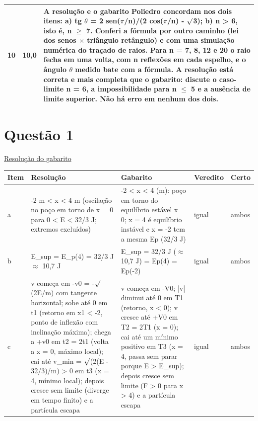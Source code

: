 \documentclass{article}%
\begin{document}
\begin{longtable}{@{}c c p{}@{}}
10 & 10,0 & A resolução e o gabarito Poliedro concordam nos dois itens: a) tg $\theta$ = 2 sen($\pi$/n)/(2 cos($\pi$/n) - $\surd$3); b) n > 6, isto é, n $\geq$ 7. Conferi a fórmula por outro caminho (lei dos senos $\times$ triângulo retângulo) e com uma simulação numérica do traçado de raios. Para n = 7, 8, 12 e 20 o raio fecha em uma volta, com n reflexões em cada espelho, e o ângulo $\theta$ medido bate com a fórmula. A resolução está correta e mais completa que o gabarito: discute o caso{-}limite n = 6, a impossibilidade para n $\leq$ 5 e a ausência de limite superior. Não há erro em nenhum dos dois. \\
\bottomrule\end{longtable}%
\section*{Questão 1}%
\href{https://poliedroresolve.sistemapoliedro.com.br/vestibulares/ime/2026/ime-2-fase-dia-2-24-10-2025-2-fase-dia-2/dissertativa-1-fisica-2-fase-dia-2-ime-2026}{Resolução do gabarito}\par\smallskip%
\begin{longtable}{@{}p{} p{} p{} p{} p{}@{}}\toprule Item & Resolução & Gabarito & Veredito & Certo \\ \midrule
a & -2 m < x < 4 m (oscilação no poço em torno de x = 0 para 0 < E < 32/3 J; extremos excluídos) & -2 < x < 4 (m): poço em torno do equilíbrio estável x = 0; x = 4 é equilíbrio instável e x = -2 tem a mesma Ep (32/3 J) & igual & ambos \\
b & E\_sup = E\_p(4) = 32/3 J $\approx$ 10,7 J & E\_sup = 32/3 J ($\approx$ 10,7 J) = Ep(4) = Ep(-2) & igual & ambos \\
c & v começa em -v0 = -$\surd$(2E/m) com tangente horizontal; sobe até 0 em t1 (retorno em x1 < -2, ponto de inflexão com inclinação máxima); chega a +v0 em t2 = 2t1 (volta a x = 0, máximo local); cai até v\_min = $\surd$(2(E - 32/3)/m) > 0 em t3 (x = 4, mínimo local); depois cresce sem limite (diverge em tempo finito) e a partícula escapa & v começa em -V0; |v| diminui até 0 em T1 (retorno, x < 0); v cresce até +V0 em T2 = 2T1 (x = 0); cai até um mínimo positivo em T3 (x = 4, passa sem parar porque E > E\_sup); depois cresce sem limite (F > 0 para x > 4) e a partícula escapa & igual & ambos \\
\bottomrule\end{longtable}%
\end{document}
